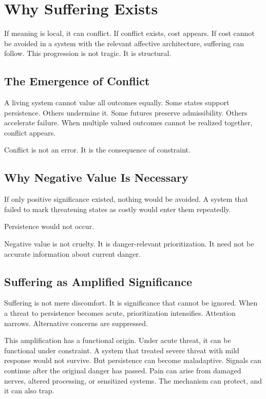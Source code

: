 \documentclass[11pt,twoside,openright]{book}
\begin{document}
\chapter{Why Suffering Exists}
\label{ch:suffering_exists}

If meaning is local, it can conflict. If conflict exists, cost appears. If cost cannot be avoided in a system with the relevant affective architecture, suffering can follow. This progression is not tragic. It is structural.

\section*{The Emergence of Conflict}

A living system cannot value all outcomes equally. Some states support persistence. Others undermine it. Some futures preserve admissibility. Others accelerate failure. When multiple valued outcomes cannot be realized together, conflict appears.

Conflict is not an error. It is the consequence of constraint.

\section*{Why Negative Value Is Necessary}

If only positive significance existed, nothing would be avoided. A system that failed to mark threatening states as costly would enter them repeatedly.

Persistence would not occur.

Negative value is not cruelty. It is danger-relevant prioritization. It need not be accurate information about current danger.

\section*{Suffering as Amplified Significance}

Suffering is not mere discomfort. It is significance that cannot be ignored. When a threat to persistence becomes acute, prioritization intensifies. Attention narrows. Alternative concerns are suppressed.

This amplification has a functional origin. Under acute threat, it can be functional under constraint. A system that treated severe threat with mild response would not survive. But persistence can become maladaptive. Signals can continue after the original danger has passed. Pain can arise from damaged nerves, altered processing, or sensitized systems. The mechanism can protect, and it can also trap.
\end{document}
